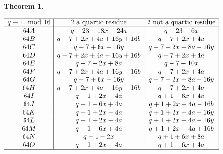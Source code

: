 \documentclass[12pt, a4paper]{article}
\newtheorem{theorem}{Theorem}[section]
\theoremstyle{definition}
\begin{document}
\begin{theorem}
\begin{itemize}
$
\begin{array}{|c|c|c|}
\hline
q \equiv 1 \mod 16 &\text{$2$ a quartic residue} &\text{$2$ not a quartic residue}\\
\hline
64A & q-23-18x-24a & q-23+6x \\
64B & q-7+2x+4a+16y+16b & q-7+2x+4a\\
64C & q-7+6x+16y& q-7-2x-8a-16y\\
64D & q-7+2x+4a-16y+16b & q-7+2x+4a\\
64E & q-7-2x+8a & q-7-10x\\
64F & q-7+2x+4a+16y-16b & q-7+2x+4a\\
64G & q-7+6x-16y & q-7-2x-8a+16y\\
64H & q-7+2x+4a-16y-16b & q-7+2x+4a\\
64I & q+1+2x-4a & q+1-6x+4a\\
64J & q+1-6x+4a & q+1+2x-4a-16b\\
64K & q+1+2x-4a  & q+1+2x-4a+16y\\
64L & q+1+2x-4a & q+1+2x-4a-16y\\
64M & q+1-6x+4a & q+1+2x-4a+16b\\
64N & q+1-2x & q+1+6x+8a\\
64O & q+1+2x-4a & q+1-6x+4a\\
\hline
\end{array}
$

\end{itemize}

\end{theorem}
\end{document}
